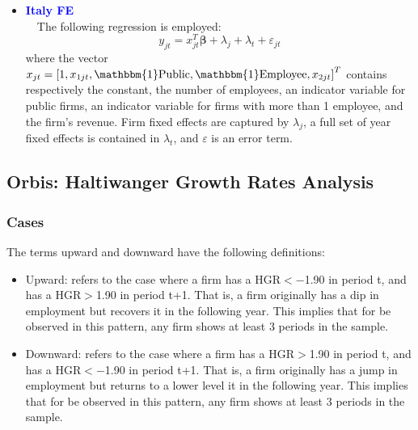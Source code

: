 \documentclass[12pt,notitlepage]{article}
\newcommand{\sym}[1] {\ifmmode^{#1} \else\(^{#1}\) \fi}
\begin{document}
\begin{itemize}
\clearpage
\item \textcolor{blue}{\textbf{Italy FE}}\\~\
The following regression is employed:
	\begin{equation}
	y_{jt} = x^{T}_{jt}\mathbf{\beta} + \lambda_{j}  + \lambda_{t} + \varepsilon_{jt}
	\end{equation}
where the vector $x_{jt} = \left[  1, x_{1jt}, \mathbbm{1}\text{Public}, \mathbbm{1}\text{Employee}, x_{2jt} \right]^{T} $ contains respectively the constant, the number of employees, an indicator variable for public firms, an indicator variable for firms with more than 1 employee, and the firm's revenue. Firm fixed effects are captured by $\lambda_{j}$, a full set of year fixed effects is contained in $\lambda_{t}$, and $\varepsilon$ is an error term.
\begin{table}[htbp]\centering
\def\sym#1{\ifmmode^{#1}\else\(^{#1}\)\fi}
\caption{Haltiwanger growth rate}
\end{table}
\end{itemize}
\clearpage

\subsection{Orbis: Haltiwanger Growth Rates Analysis}
\subsubsection{Cases}

The terms upward and downward have the following definitions:
\begin{itemize}
\item Upward: refers to the case where a firm has a HGR$<-$1.90 in period t, and has a HGR$>$1.90 in period t+1. That is, a firm originally has a dip in employment but recovers it in the following year. This implies that for be observed in this pattern, any firm shows at least 3 periods in the sample.
\item Downward: refers to the case where a firm has a HGR$>$1.90 in period t, and has a HGR$<-$1.90 in period t+1. That is, a firm originally has a jump in employment but returns to a lower level it in the following year. This implies that for be observed in this pattern, any firm shows at least 3 periods in the sample.
\end{itemize}
\end{document}
